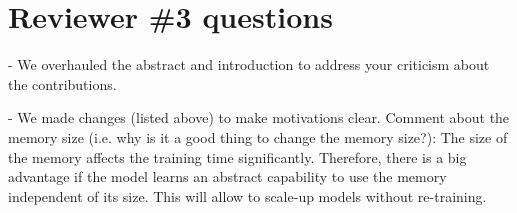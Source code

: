 \documentclass[10pt,twocolumn,letterpaper]{article}
\begin{document}
\section{Reviewer \#3 questions}
 - We overhauled the abstract and  introduction to address your criticism about the contributions.

 - We made changes (listed above) to make motivations clear.
Comment about the memory size (i.e. why is it a good thing to change the memory size?): The size of the memory affects the training time significantly. Therefore, there is a big advantage if the model learns an abstract capability to use the memory independent of its size.  This will allow to scale-up models without re-training.
% 
% 
\end{document}
